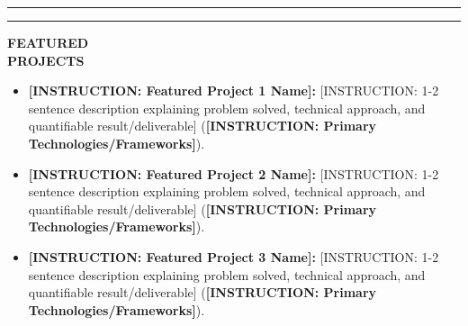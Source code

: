 \documentclass[10pt,a4paper]{article}
\newcommand{\sectionline}{%
  \vspace{4pt}%
  \noindent%
  \begin{minipage}[b]{3.5cm}%
    \color{bannerblue}\rule{\linewidth}{4.5pt}%
  \end{minipage}%
  \hspace{0.3cm}%
  \begin{minipage}[b]{\dimexpr\textwidth-3.8cm\relax}%
    \color{dividerblue}\rule{\linewidth}{1.2pt}%
  \end{minipage}%
  \par \vspace{4pt}%
}
\newcommand{\cvblock}[2]{%
  \vspace{2pt}%
  \noindent%
  \begin{minipage}[t]{3.5cm}%
    \raggedright \bfseries \small \color{textdark} #1%
  \end{minipage}%
  \hspace{0.3cm}%
  \begin{minipage}[t]{\dimexpr\textwidth-3.8cm\relax}%
    \small \color{textdark} #2%
  \end{minipage}%
  \par \vspace{3pt}%
}
\begin{document}
\sectionline
\cvblock{FEATURED\\PROJECTS}{%
  \begin{itemize}
    \item \textbf{[INSTRUCTION: Featured Project 1 Name]:} [INSTRUCTION: 1-2 sentence description explaining problem solved, technical approach, and quantifiable result/deliverable] (\textbf{[INSTRUCTION: Primary Technologies/Frameworks]}).
    \item \textbf{[INSTRUCTION: Featured Project 2 Name]:} [INSTRUCTION: 1-2 sentence description explaining problem solved, technical approach, and quantifiable result/deliverable] (\textbf{[INSTRUCTION: Primary Technologies/Frameworks]}).
    \item \textbf{[INSTRUCTION: Featured Project 3 Name]:} [INSTRUCTION: 1-2 sentence description explaining problem solved, technical approach, and quantifiable result/deliverable] (\textbf{[INSTRUCTION: Primary Technologies/Frameworks]}).
  \end{itemize}
}
\end{document}
